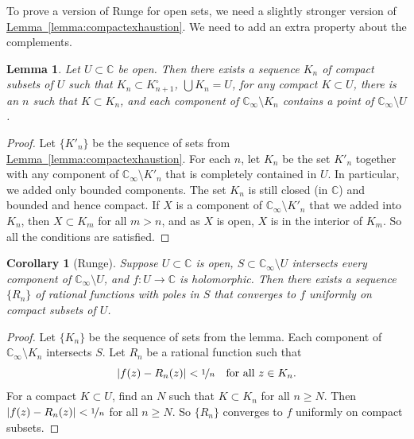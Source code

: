 \documentclass[12pt,openany]{book}
\newcommand{\abs}[1]{\left\lvert {#1} \right\rvert}
\newcommand{\C}{{\mathbb{C}}}
\theoremstyle{plain}
\newtheorem{lemma}[thm]{Lemma}
\newtheorem{cor}[thm]{Corollary}
\theoremstyle{remark}
\theoremstyle{definition}
\theoremstyle{exercise}
\theoremstyle{example}
\newcommand{\lemmaref}[1]{\hyperref[#1]{Lemma~\ref*{#1}}}
\begin{document}
To prove a version of Runge for open sets,
we need a slightly stronger version of
\lemmaref{lemma:compactexhaustion}.  We need to add 
an extra property about the complements.

\begin{lemma}\label{lemma:compactexhaustion2}
Let $U \subset \C$ be open.  Then there exists a sequence $K_n$
of compact subsets of $U$ such that $K_n \subset K^\circ_{n+1}$,
$\bigcup K_n = U$,
for any compact $K \subset U$, there is an $n$ such that $K \subset K_n$,
and each component of $\C_\infty \setminus K_n$ contains a point of
$\C_\infty \setminus U$.
\end{lemma}

\begin{proof}
Let $\{ K'_n \}$ be the sequence of sets from
\lemmaref{lemma:compactexhaustion}.
For each $n$, let $K_n$ be the set $K'_n$ together with any 
component of $\C_\infty \setminus K'_n$ that is completely contained in $U$.
In particular, we added only bounded components.
The set $K_n$ is still closed (in $\C$) and bounded and hence compact.
If $X$ is a component of $\C_\infty \setminus K'_n$ that we added into
$K_n$, then $X \subset K_{m}$ for all $m > n$, and as $X$ is open,
$X$ is in the interior of $K_{m}$.  So all the conditions are 
satisfied.
\end{proof}

\begin{cor}[Runge]
\label{cor:rungeseq}
Suppose $U \subset \C$ is open, $S \subset \C_{\infty} \setminus U$
intersects every component of $\C_\infty \setminus U$,
and $f \colon U \to \C$ is holomorphic.
Then there exists a sequence $\{ R_n \}$ of rational functions with poles in $S$
that converges to $f$ uniformly on compact subsets of $U$.
\end{cor}

\begin{proof}
Let $\{ K_n \}$ be the sequence of sets from the lemma.
Each component of $\C_\infty \setminus K_n$ intersects $S$.
Let $R_n$ be a rational function such that
\begin{equation*}
\abs{f(z)-R_n(z)} < \nicefrac{1}{n}
\quad
\text{for all } z \in K_n .
\end{equation*}
For a compact $K \subset U$, find an $N$ such that $K \subset K_n$ for
all $n \geq N$.  Then $\abs{f(z)-R_n(z)} < \nicefrac{1}{n}$ for all
$n \geq N$. So $\{ R_n \}$ converges to $f$ uniformly on compact subsets.
\end{proof}
\end{document}

